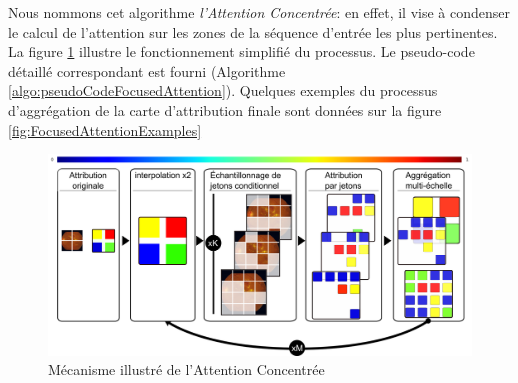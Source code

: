 Nous nommons cet algorithme \textit{l'Attention Concentrée}: en effet, il vise à condenser le calcul de l'attention sur les zones de la séquence d'entrée les plus pertinentes. La figure \ref{fig:focusedattentionmechanism} illustre le fonctionnement simplifié du processus. Le pseudo-code détaillé correspondant est fourni (Algorithme \ref{algo:pseudoCodeFocusedAttention}). Quelques exemples du processus d'aggrégation de la carte d'attribution finale sont données sur la figure \ref{fig:FocusedAttentionExamples}
\begin{figure}[htb]
	\centering
	\includegraphics[width=.8\textwidth]{gnuplot/focused_attention/focusedAttention/focusedAttentionMechanism}
	\caption{Mécanisme illustré de l'Attention Concentrée}
	\label{fig:focusedattentionmechanism}
\end{figure}

